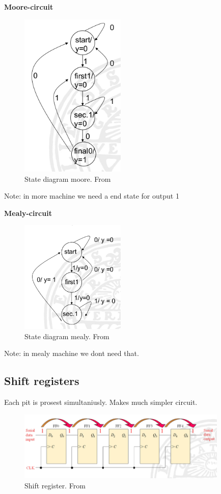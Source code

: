 \newpage
\textbf{Moore-circuit}  
\begin{figure}[h]
    \centering
    \includegraphics[width=5cm]{image/state-diagram-moore.png}
    \caption{State diagram moore. From \cite{}}
\end{figure}
Note: in more machine we need a end state for output 1

\textbf{Mealy-circuit}  
\begin{figure}[h]
    \centering
    \includegraphics[width=5cm]{image/state-diagram-mealy.png}
    \caption{State diagram mealy. From \cite{}}
\end{figure}
Note: in mealy machine we dont need that.





\newpage
\subsection{Shift registers}
Each pit is prosest simultaniusly. Makes much simpler circuit.
\begin{figure}[h]
    \centering
    \includegraphics[width=10cm]{image/shift-register.png}
    \caption{Shift register. From \cite{}}
\end{figure}

